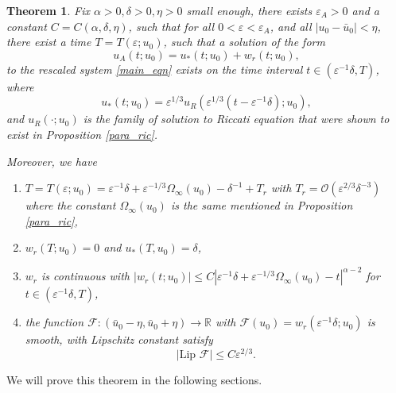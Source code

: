 \documentclass[letterpaper,11pt]{article}
\newcommand{\rmO}{\mathcal{O}}
\newcommand{\eps}{\varepsilon}
\numberwithin{equation}{section}
\theoremstyle{plain}
\newtheorem{theorem}{Theorem}[section]
\begin{document}
\begin{theorem}\label{thm:r}
Fix $\alpha>0, \delta>0, \eta>0$ small enough, there exists $\eps_A>0$ and a constant $C=C(\alpha,\delta,\eta)$, such that for all $0<\eps <\eps_A$, and all $|u_0 - \bar{u}_0|<\eta$, there exist a time $T=T(\eps;u_0)$, such that a solution of the form
\begin{equation}
u_A(t;u_0) = u_*(t; u_0) + w_r(t; u_0),
\end{equation}
to the rescaled system \eqref{main_eqn} exists on the time interval $t \in (\eps^{-1}\delta, T)$,
where
\begin{equation}
u_*(t; u_0) = \eps^{1/3}u_R(\eps^{1/3}(t-\eps^{-1}\delta); u_0),
\end{equation} and $u_R(\cdot; u_0)$ is the family of solution to Riccati equation that were shown to exist in Proposition \ref{para_ric}. 

Moreover, we have
\begin{enumerate}[label=\textnormal{(\arabic*)}]
\item \label{thm:r_1}$T=T(\eps;u_0) = \eps^{-1}\delta+\eps^{-1/3}\Omega_\infty(u_0)-\delta^{-1}+T_r$ with $T_r = \rmO( \eps^{2/3}\delta^{-3} )$ where the constant $\Omega_\infty(u_0)$ is the same mentioned in Proposition \ref{para_ric},
\item \label{thm:r_2} $w_r(T; u_0) = 0$ and $u_*(T,u_0)=\delta$,

\item \label{thm:r_3} $w_r$ is continuous with $|w_r(t; u_0)| \le C|\eps^{-1}\delta+\eps^{-1/3}\Omega_\infty(u_0)-t|^{\alpha-2}$ for $t \in (\eps^{-1}\delta, T)$,

\item \label{thm:r_4} the function 
$\mathcal{F}: (\bar{u}_0-\eta, \bar{u}_0+\eta) \to \mathbb{R}$ with $\mathcal{F}(u_0)=  w_r(\eps^{-1}\delta; u_0)$ is smooth, with Lipschitz constant satisfy 
\[
|\text{Lip }\mathcal{F} |\le C\eps^{2/3} . 
\]
\end{enumerate}

\end{theorem}

We will prove this theorem in the following sections.
\end{document}
